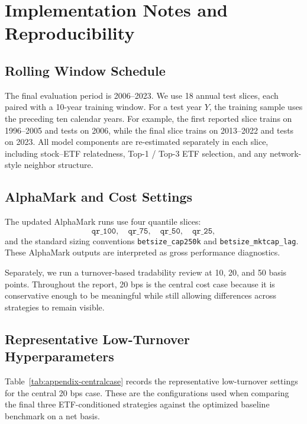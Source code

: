 \section{Implementation Notes and Reproducibility}
\label{sec:appendix-impl}

\subsection{Rolling Window Schedule}

The final evaluation period is 2006--2023. We use 18 annual test slices, each paired with a 10-year training window. For a test year $Y$, the training sample uses the preceding ten calendar years. For example, the first reported slice trains on 1996--2005 and tests on 2006, while the final slice trains on 2013--2022 and tests on 2023. All model components are re-estimated separately in each slice, including stock--ETF relatedness, Top-1 / Top-3 ETF selection, and any network-style neighbor structure.

\subsection{AlphaMark and Cost Settings}

The updated AlphaMark runs use four quantile slices:
\[
\texttt{qr\_100},\quad
\texttt{qr\_75},\quad
\texttt{qr\_50},\quad
\texttt{qr\_25},
\]
and the standard sizing conventions \texttt{betsize\_cap250k} and \texttt{betsize\_mktcap\_lag}. These AlphaMark outputs are interpreted as gross performance diagnostics.

Separately, we run a turnover-based tradability review at 10, 20, and 50 basis points. Throughout the report, 20 bps is the central cost case because it is conservative enough to be meaningful while still allowing differences across strategies to remain visible.

\subsection{Representative Low-Turnover Hyperparameters}

Table~\ref{tab:appendix-centralcase} records the representative low-turnover settings for the central 20 bps case. These are the configurations used when comparing the final three ETF-conditioned strategies against the optimized baseline benchmark on a net basis.

